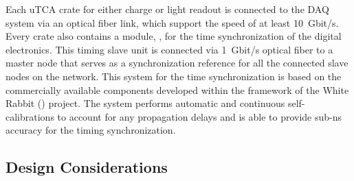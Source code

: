 Each uTCA crate for either charge or light readout is connected to the DAQ system via an optical fiber link, which support the speed of at least \SI{10}{Gbit/s}. Every crate also contains a module, , for the time synchronization of the digital electronics. This timing slave unit is connected via \SI{1}{Gbit/s} optical fiber to a master node that serves as a synchronization reference for all the connected slave nodes on the network. This system for the time synchronization is based on the commercially available components developed within the framework of the White Rabbit () project. The system performs automatic and continuous self-calibrations to account for any propagation delays and is able to provide sub-ns accuracy for the timing synchronization.


\subsection{Design Considerations}
\label{sec:fddp-tpc-elec-des-consid}


